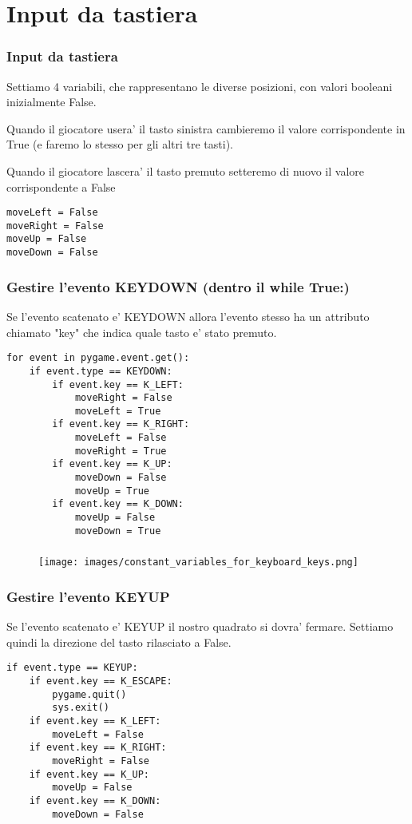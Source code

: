 \documentclass{beamer}
\begin{document}
\section{Input da tastiera}

\begin{frame}[fragile]
    \frametitle{Input da tastiera}
    Settiamo 4 variabili, che rappresentano le diverse posizioni, con valori booleani inizialmente False.
    
    Quando il giocatore usera' il tasto sinistra cambieremo il valore corrispondente in True (e faremo lo stesso per gli altri tre tasti).
    
    Quando il giocatore lascera' il tasto premuto setteremo di nuovo il valore corrispondente a False
    \begin{lstlisting}
moveLeft = False
moveRight = False                                                                                                             
moveUp = False
moveDown = False 
    \end{lstlisting}
\end{frame}

\begin{frame}[fragile]
\frametitle{Gestire l'evento KEYDOWN (dentro il while True:)}
Se l'evento scatenato e' KEYDOWN allora l'evento stesso ha un attributo chiamato "key" che indica quale tasto e' stato premuto.

\begin{lstlisting}
for event in pygame.event.get():
    if event.type == KEYDOWN:
        if event.key == K_LEFT:
            moveRight = False
            moveLeft = True
        if event.key == K_RIGHT:
            moveLeft = False
            moveRight = True
        if event.key == K_UP:
            moveDown = False
            moveUp = True
        if event.key == K_DOWN:
            moveUp = False
            moveDown = True
\end{lstlisting}
    
\end{frame}

\begin{frame}{}
\frametitle{}
			\begin{figure}
   				\texttt{[image: images/constant\_variables\_for\_keyboard\_keys.png]}
			\end{figure}
\end{frame}

\begin{frame}[fragile]
\frametitle{Gestire l'evento KEYUP}
Se l'evento scatenato e' KEYUP il nostro quadrato si dovra' fermare. Settiamo quindi la direzione del tasto rilasciato a False.

\begin{lstlisting}
if event.type == KEYUP:
    if event.key == K_ESCAPE:
        pygame.quit()
        sys.exit()
    if event.key == K_LEFT:
        moveLeft = False
    if event.key == K_RIGHT:
        moveRight = False
    if event.key == K_UP:
        moveUp = False
    if event.key == K_DOWN:
        moveDown = False
\end{lstlisting}
\end{frame}
\end{document}
